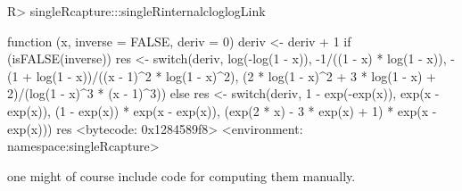\documentclass[
]{jss}
\newcommand{\1}{\mathcal{I}} \newcommand{\bZero}{\boldsymbol{0}}
\begin{document}
\begin{CodeChunk}
\begin{CodeInput}
R> singleRcapture:::singleRinternalcloglogLink
\end{CodeInput}
\begin{CodeOutput}
function (x, inverse = FALSE, deriv = 0) 
{
    deriv <- deriv + 1
    if (isFALSE(inverse)) {
        res <- switch(deriv, log(-log(1 - x)), -1/((1 - x) * 
            log(1 - x)), -(1 + log(1 - x))/((x - 1)^2 * log(1 - 
            x)^2), (2 * log(1 - x)^2 + 3 * log(1 - x) + 2)/(log(1 - 
            x)^3 * (x - 1)^3))
    }
    else {
        res <- switch(deriv, 1 - exp(-exp(x)), exp(x - exp(x)), 
            (1 - exp(x)) * exp(x - exp(x)), (exp(2 * x) - 3 * 
                exp(x) + 1) * exp(x - exp(x)))
    }
    res
}
<bytecode: 0x1284589f8>
<environment: namespace:singleRcapture>
\end{CodeOutput}
\end{CodeChunk}

\normalsize

one might of course include code for computing them manually.


\end{document}
